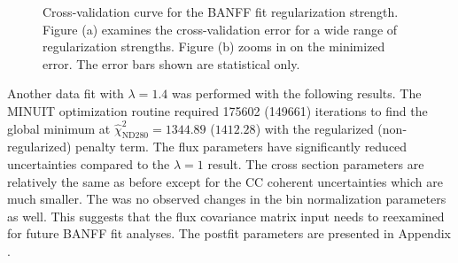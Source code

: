 \begin{figure}
\begin{centering}
\par\end{centering}
\caption[Cross-Validation Curve for the BANFF Fit Regularization Strength.]{Cross-validation curve for the BANFF fit regularization strength.
Figure (a) examines the cross-validation error for a wide range of
regularization strengths. Figure (b) zooms in on the minimized error.
The error bars shown are statistical only.  \label{fig:Cross-validation}}

\end{figure}

Another data fit with $\lambda=1.4$ was performed with the following
results. The MINUIT optimization routine required 175602 (149661)
iterations to find the global minimum at $\hat{\chi}_{\text{ND}280}^{2}=1344.89$
($1412.28$) with the regularized (non-regularized) penalty term.
The flux parameters have significantly reduced uncertainties compared
to the $\lambda=1$ result. The cross section parameters are relatively
the same as before except for the CC coherent uncertainties which
are much smaller. The was no observed changes in the bin normalization
parameters as well. This suggests that the flux covariance matrix
input needs to reexamined for future BANFF fit analyses. The postfit
parameters are presented in Appendix .

